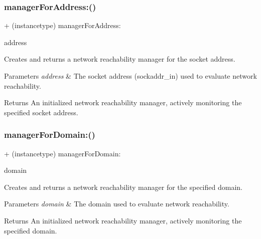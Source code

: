 \subsubsection{\texorpdfstring{manager\+For\+Address\+:()}{managerForAddress:()}\hspace{0.1cm}{\footnotesize\ttfamily [3/3]}}
{\footnotesize\ttfamily + (instancetype) manager\+For\+Address\+: \begin{DoxyParamCaption}\item[{(const void $\ast$)}]{address }\end{DoxyParamCaption}}

Creates and returns a network reachability manager for the socket address.


\begin{DoxyParams}{Parameters}
{\em address} & The socket address ({\ttfamily sockaddr\+\_\+in}) used to evaluate network reachability.\\
\hline
\end{DoxyParams}
\begin{DoxyReturn}{Returns}
An initialized network reachability manager, actively monitoring the specified socket address. 
\end{DoxyReturn}
\mbox{\label{interface_a_f_network_reachability_manager_a6bb357339197c29a2305519e7e4622f3}} 
\subsubsection{\texorpdfstring{manager\+For\+Domain\+:()}{managerForDomain:()}\hspace{0.1cm}{\footnotesize\ttfamily [1/3]}}
{\footnotesize\ttfamily + (instancetype) manager\+For\+Domain\+: \begin{DoxyParamCaption}\item[{(N\+S\+String $\ast$)}]{domain }\end{DoxyParamCaption}}

Creates and returns a network reachability manager for the specified domain.


\begin{DoxyParams}{Parameters}
{\em domain} & The domain used to evaluate network reachability.\\
\hline
\end{DoxyParams}
\begin{DoxyReturn}{Returns}
An initialized network reachability manager, actively monitoring the specified domain. 
\end{DoxyReturn}
\mbox{\label{interface_a_f_network_reachability_manager_a6bb357339197c29a2305519e7e4622f3}} 
